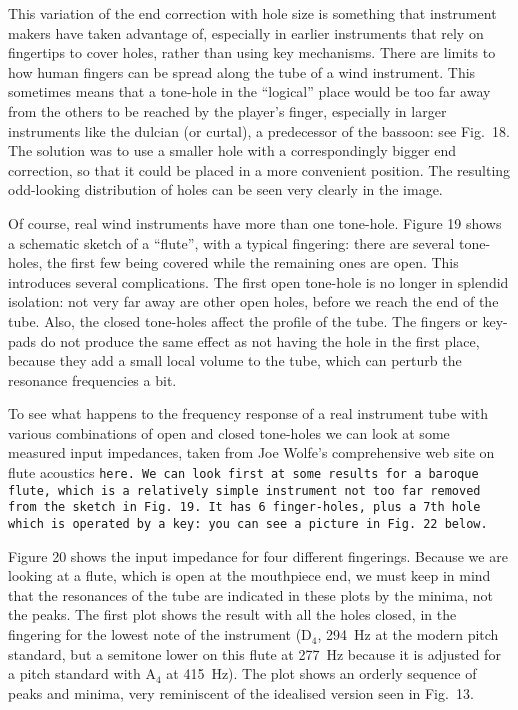   This variation of the end correction with hole size is something that 
  instrument makers have taken advantage of, especially in earlier instruments 
  that rely on fingertips to cover holes, rather than using key mechanisms. 
  There are limits to how human fingers can be spread along the tube of a wind 
  instrument. This sometimes means that a tone-hole in the ``logical'' place 
  would be too far away from the others to be reached by the player's finger, 
  especially in larger instruments like the dulcian (or curtal), a predecessor 
  of the bassoon: see Fig.\ 18. The solution was to use a smaller hole with a 
  correspondingly bigger end correction, so that it could be placed in a more 
  convenient position. The resulting odd-looking distribution of holes can be 
  seen very clearly in the image. 


  Of course, real wind instruments have more than one tone-hole. Figure 19 
  shows a schematic sketch of a “flute”, with a typical fingering: there are 
  several tone-holes, the first few being covered while the remaining ones are 
  open. This introduces several complications. The first open tone-hole is no 
  longer in splendid isolation: not very far away are other open holes, before 
  we reach the end of the tube. Also, the closed tone-holes affect the profile 
  of the tube. The fingers or key-pads do not produce the same effect as not 
  having the hole in the first place, because they add a small local volume to 
  the tube, which can perturb the resonance frequencies a bit. 

  To see what happens to the frequency response of a real instrument tube with 
  various combinations of open and closed tone-holes we can look at some 
  measured input impedances, taken from Joe Wolfe's comprehensive web site on 
  flute acoustics \tt{}here\rm{}. We can look first at some results for a 
  baroque flute, which is a relatively simple instrument not too far removed 
  from the sketch in Fig.\ 19. It has 6 finger-holes, plus a 7th hole which is 
  operated by a key: you can see a picture in Fig.\ 22 below. 

  Figure 20 shows the input impedance for four different fingerings. Because we 
  are looking at a flute, which is open at the mouthpiece end, we must keep in 
  mind that the resonances of the tube are indicated in these plots by the 
  minima, not the peaks. The first plot shows the result with all the holes 
  closed, in the fingering for the lowest note of the instrument 
  ($\mathrm{D}_4$, 294~Hz at the modern pitch standard, but a semitone lower on 
  this flute at 277~Hz because it is adjusted for a pitch standard with 
  $\mathrm{A}_4$ at 415~Hz). The plot shows an orderly sequence of peaks and 
  minima, very reminiscent of the idealised version seen in Fig.\ 13. 

